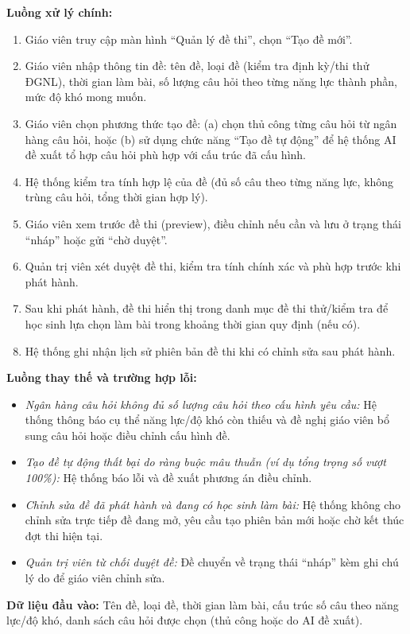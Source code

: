 \documentclass[12pt,a4paper]{article}
\newcommand{\ucfield}[2]{\noindent\textbf{#1: } #2\par\vspace{0.35em}}
\begin{document}
	\ucfield{Luồng xử lý chính}{
		\begin{enumerate}[nosep]
			\item Giáo viên truy cập màn hình ``Quản lý đề thi'', chọn ``Tạo đề mới''.
			\item Giáo viên nhập thông tin đề: tên đề, loại đề (kiểm tra định kỳ/thi thử ĐGNL), thời gian làm bài, số lượng câu hỏi theo từng năng lực thành phần, mức độ khó mong muốn.
			\item Giáo viên chọn phương thức tạo đề: (a) chọn thủ công từng câu hỏi từ ngân hàng câu hỏi, hoặc (b) sử dụng chức năng ``Tạo đề tự động'' để hệ thống AI đề xuất tổ hợp câu hỏi phù hợp với cấu trúc đã cấu hình.
			\item Hệ thống kiểm tra tính hợp lệ của đề (đủ số câu theo từng năng lực, không trùng câu hỏi, tổng thời gian hợp lý).
			\item Giáo viên xem trước đề thi (preview), điều chỉnh nếu cần và lưu ở trạng thái ``nháp'' hoặc gửi ``chờ duyệt''.
			\item Quản trị viên xét duyệt đề thi, kiểm tra tính chính xác và phù hợp trước khi phát hành.
			\item Sau khi phát hành, đề thi hiển thị trong danh mục đề thi thử/kiểm tra để học sinh lựa chọn làm bài trong khoảng thời gian quy định (nếu có).
			\item Hệ thống ghi nhận lịch sử phiên bản đề thi khi có chỉnh sửa sau phát hành.
	\end{enumerate}}
	
	\ucfield{Luồng thay thế và trường hợp lỗi}{
		\begin{itemize}[nosep]
			\item \textit{Ngân hàng câu hỏi không đủ số lượng câu hỏi theo cấu hình yêu cầu:} Hệ thống thông báo cụ thể năng lực/độ khó còn thiếu và đề nghị giáo viên bổ sung câu hỏi hoặc điều chỉnh cấu hình đề.
			\item \textit{Tạo đề tự động thất bại do ràng buộc mâu thuẫn (ví dụ tổng trọng số vượt 100\%):} Hệ thống báo lỗi và đề xuất phương án điều chỉnh.
			\item \textit{Chỉnh sửa đề đã phát hành và đang có học sinh làm bài:} Hệ thống không cho chỉnh sửa trực tiếp đề đang mở, yêu cầu tạo phiên bản mới hoặc chờ kết thúc đợt thi hiện tại.
			\item \textit{Quản trị viên từ chối duyệt đề:} Đề chuyển về trạng thái ``nháp'' kèm ghi chú lý do để giáo viên chỉnh sửa.
	\end{itemize}}
	
	\ucfield{Dữ liệu đầu vào}{Tên đề, loại đề, thời gian làm bài, cấu trúc số câu theo năng lực/độ khó, danh sách câu hỏi được chọn (thủ công hoặc do AI đề xuất).}
	
\end{document}
